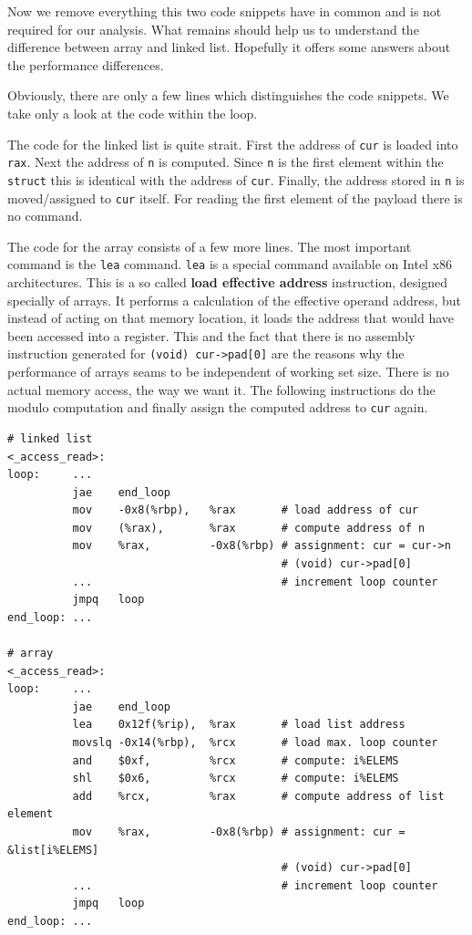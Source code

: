 Now we remove everything this two code snippets have in common and is
not required for our analysis. What remains should help us to understand
the difference between array and linked list. Hopefully it offers some
answers about the performance differences.

Obviously, there are only a few lines which distinguishes the code
snippets. We take only a look at the code within the loop.

The code for the linked list is quite strait. First the address of
\texttt{cur} is loaded into \texttt{rax}. Next the address of \texttt{n}
is computed. Since \texttt{n} is the first element within the
\texttt{struct} this is identical with the address of \texttt{cur}.
Finally, the address stored in \texttt{n} is moved/assigned to
\texttt{cur} itself. For reading the first element of the payload there
is no command.

The code for the array consists of a few more lines. The most important
command is the \texttt{lea} command. \texttt{lea} is a special command
available on Intel x86 architectures. This is a so called \textbf{load
effective address} instruction, designed specially of arrays. It
performs a calculation of the effective operand address, but instead of
acting on that memory location, it loads the address that would have
been accessed into a register. This and the fact that there is no
assembly instruction generated for
\texttt{(void)\ cur-\textgreater{}pad{[}0{]}} are the reasons why the
performance of arrays seams to be independent of working set size. There
is no actual memory access, the way we want it. The following
instructions do the modulo computation and finally assign the computed
address to \texttt{cur} again.

\begin{verbatim}
# linked list
<_access_read>:
loop:     ...
          jae    end_loop
          mov    -0x8(%rbp),   %rax       # load address of cur
          mov    (%rax),       %rax       # compute address of n
          mov    %rax,         -0x8(%rbp) # assignment: cur = cur->n
                                          # (void) cur->pad[0]
          ...                             # increment loop counter
          jmpq   loop
end_loop: ...

# array
<_access_read>:
loop:     ...
          jae    end_loop
          lea    0x12f(%rip),  %rax       # load list address
          movslq -0x14(%rbp),  %rcx       # load max. loop counter
          and    $0xf,         %rcx       # compute: i%ELEMS
          shl    $0x6,         %rcx       # compute: i%ELEMS
          add    %rcx,         %rax       # compute address of list element
          mov    %rax,         -0x8(%rbp) # assignment: cur = &list[i%ELEMS]
                                          # (void) cur->pad[0]
          ...                             # increment loop counter
          jmpq   loop
end_loop: ...
\end{verbatim}

